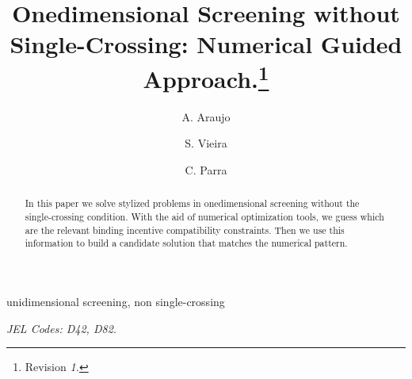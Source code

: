 \documentclass{article}
\begin{document}
\begin{frontmatter}
\title{Onedimensional Screening without Single-Crossing: Numerical Guided Approach.\footnote{Revision \textit{1.\svnrev}}} 

	\author[I,E]{A. Araujo} 
	\author[I]{S. Vieira}
    \author[I]{C. Parra}

	\address[I]{Instituto Nacional de Matemática Pura e Aplicada, Estrada Dona Castorina 110, Rio de Janeiro, Brasil}
	\address[E]{Graduate School of Economics, Getúlio Vargas Foundation, Praia de Botafogo, 190, Rio de Janeiro, Brazil}

\begin{abstract}
In this paper we solve stylized problems in  
onedimensional screening without the single-crossing condition. With the aid of numerical optimization tools, we guess which are the relevant binding incentive compatibility constraints. Then we use this information to build a candidate solution that matches the numerical pattern.
\end{abstract}


\begin{keyword}
unidimensional screening, non single-crossing
   
\smallskip  
  
\textit{JEL Codes: D42, D82.}  
\end{keyword}
\end{frontmatter}
\end{document}
